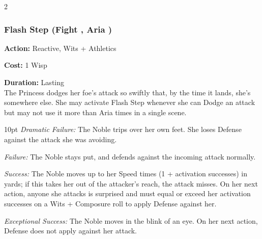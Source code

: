 \begin{multicols}{2}





\subsubsection*{Flash Step (Fight \textbullet\textbullet\textbullet, Aria \textbullet\textbullet\textbullet)}

\noindent \textbf{Action:} Reactive, Wits + Athletics

\noindent \textbf{Cost:} 1 Wisp

\noindent \textbf{Duration:} Lasting\\

\noindent The Princess dodges her foe's attack so swiftly that, by the time it lands, she's somewhere else. She may activate Flash Step whenever she can Dodge an attack but may not use it more than Aria times in a single scene. 

\begin{myindentpar}{10pt} 
\emph{Dramatic Failure:}  The Noble trips over her own feet. She loses Defense against the attack she was avoiding.

\emph{Failure:} The Noble stays put, and defends against the incoming attack normally.

\emph{Success:}  The Noble moves up to her Speed times (1 + activation successes) in yards; if this takes her out of the attacker’s reach, the attack misses. On her next action, anyone she attacks is surprised and must equal or exceed her activation successes on a Wits + Composure roll to apply Defense against her.

\emph{Exceptional Success:} The Noble moves in the blink of an eye. On her next action, Defense does not apply against her attack.\end{myindentpar}



\end{multicols}
